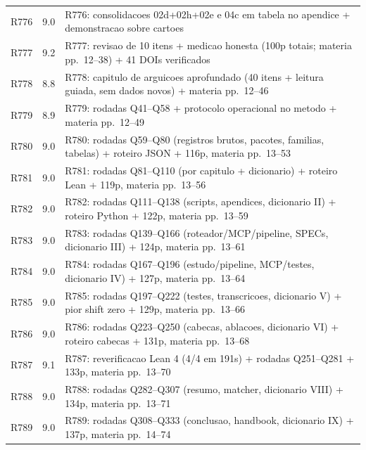 \begin{longtable}{p{1.1cm}p{1.2cm}p{12.2cm}}
R776 & 9.0 & \parbox[t]{12cm}{\raggedright\footnotesize R776: consolidacoes 02d+02h+02e e 04c em tabela no apendice + demonstracao sobre cartoes} \\
R777 & 9.2 & \parbox[t]{12cm}{\raggedright\footnotesize R777: revisao de 10 itens + medicao honesta (100p totais; materia pp.\ 12--38) + 41 DOIs verificados} \\
R778 & 8.8 & \parbox[t]{12cm}{\raggedright\footnotesize R778: capitulo de arguicoes aprofundado (40 itens + leitura guiada, sem dados novos) + materia pp.\ 12--46} \\
R779 & 8.9 & \parbox[t]{12cm}{\raggedright\footnotesize R779: rodadas Q41--Q58 + protocolo operacional no metodo + materia pp.\ 12--49} \\
R780 & 9.0 & \parbox[t]{12cm}{\raggedright\footnotesize R780: rodadas Q59--Q80 (registros brutos, pacotes, familias, tabelas) + roteiro JSON + 116p, materia pp.\ 13--53} \\
R781 & 9.0 & \parbox[t]{12cm}{\raggedright\footnotesize R781: rodadas Q81--Q110 (por capitulo + dicionario) + roteiro Lean + 119p, materia pp.\ 13--56} \\
R782 & 9.0 & \parbox[t]{12cm}{\raggedright\footnotesize R782: rodadas Q111--Q138 (scripts, apendices, dicionario II) + roteiro Python + 122p, materia pp.\ 13--59} \\
R783 & 9.0 & \parbox[t]{12cm}{\raggedright\footnotesize R783: rodadas Q139--Q166 (roteador/MCP/pipeline, SPECs, dicionario III) + 124p, materia pp.\ 13--61} \\
R784 & 9.0 & \parbox[t]{12cm}{\raggedright\footnotesize R784: rodadas Q167--Q196 (estudo/pipeline, MCP/testes, dicionario IV) + 127p, materia pp.\ 13--64} \\
R785 & 9.0 & \parbox[t]{12cm}{\raggedright\footnotesize R785: rodadas Q197--Q222 (testes, transcricoes, dicionario V) + pior shift zero + 129p, materia pp.\ 13--66} \\
R786 & 9.0 & \parbox[t]{12cm}{\raggedright\footnotesize R786: rodadas Q223--Q250 (cabecas, ablacoes, dicionario VI) + roteiro cabecas + 131p, materia pp.\ 13--68} \\
R787 & 9.1 & \parbox[t]{12cm}{\raggedright\footnotesize R787: reverificacao Lean 4 (4/4 em 191s) + rodadas Q251--Q281 + 133p, materia pp.\ 13--70} \\
R788 & 9.0 & \parbox[t]{12cm}{\raggedright\footnotesize R788: rodadas Q282--Q307 (resumo, matcher, dicionario VIII) + 134p, materia pp.\ 13--71} \\
R789 & 9.0 & \parbox[t]{12cm}{\raggedright\footnotesize R789: rodadas Q308--Q333 (conclusao, handbook, dicionario IX) + 137p, materia pp.\ 14--74} \\

\end{longtable}
